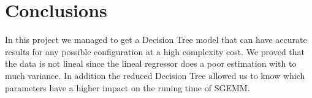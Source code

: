 \documentclass[sigconf,authorversion]{acmart}
\begin{document}
\section{Conclusions}
In this project we managed to get a Decision Tree model that can have accurate results for any possible configuration at a high complexity cost. We proved that the data is not lineal since the lineal regressor does a poor estimation with to much variance. In addition the reduced Decision Tree allowed us to know which parameters have a higher impact on the runing time of SGEMM.


\end{document}
